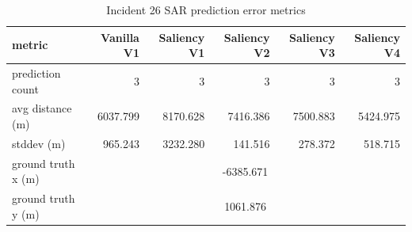 \begin{table}[ht]
\centering
\caption{Incident 26 SAR prediction error metrics}
\label{tab:sar-incident-26}
\begin{tabular}{lrrrrr}
\hline
metric & Vanilla V1 & Saliency V1 & Saliency V2 & Saliency V3 & Saliency V4 \\
\hline
prediction count & 3 & 3 & 3 & 3 & 3 \\
avg distance (m) & 6037.799 & 8170.628 & 7416.386 & 7500.883 & 5424.975 \\
stddev (m) & 965.243 & 3232.280 & 141.516 & 278.372 & 518.715 \\
ground truth x (m) & \multicolumn{5}{c}{-6385.671} \\
ground truth y (m) & \multicolumn{5}{c}{1061.876} \\
\hline
\end{tabular}
\end{table}
